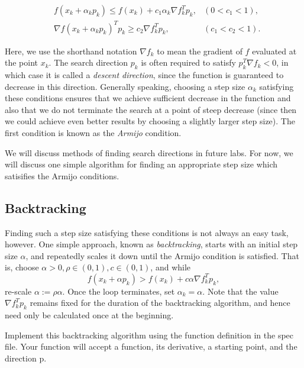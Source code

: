 \begin{align*}
&f(x_k + \alpha_kp_k) \leq f(x_k) + c_1\alpha_k\nabla f_k^Tp_k, &(0 < c_1 < 1),
\\ &\nabla f(x_k + \alpha_kp_k)^Tp_k \geq c_2\nabla f_k^Tp_k, &(c_1 < c_2 < 1).
\end{align*}

Here, we use the shorthand notation $\nabla f_k$ to
mean the gradient of $f$ evaluated at the point $x_k$. The search direction $p_k$ is
often required to satisfy $p_k^T \nabla f_k < 0$, in which case it is called a
\emph{descent direction}, since the function is guaranteed to decrease in
this direction. Generally speaking, choosing a step size $\alpha_k$ satisfying these conditions
ensures that we achieve sufficient decrease in the function and also that we do not
terminate the search at a point of steep decrease (since then we could achieve even
better results by choosing a slightly larger step size). The first condition is known
as the \emph{Armijo} condition.

We will discuss methods of finding search directions in future labs. For now, we will discuss
one simple algorithm for finding an appropriate step size which satisifies the Armijo conditions.

\subsection*{Backtracking}

Finding such a step size satisfying these conditions is not always an easy task, however.
One simple approach, known as \emph{backtracking}, starts with an initial step size
$\alpha$, and repeatedly scales it down until the Armijo condition is satisfied.
That is, choose $\alpha >0, \rho \in (0, 1), c\in (0, 1)$, and while
$$
f(x_k + \alpha p_k) > f(x_k) + c\alpha\nabla f_k^Tp_k,
$$
re-scale $\alpha := \rho\alpha$. Once the loop terminates, set $\alpha_k = \alpha$. Note that the value
$\nabla f_k^Tp_k$ remains fixed for the duration of the backtracking algorithm, and hence need only
be calculated once at the beginning.

\begin{problem}
Implement this backtracking algorithm using the function definition in the spec file.
Your function will accept a function, its derivative, a starting point, and the direction p.
\end{problem}

